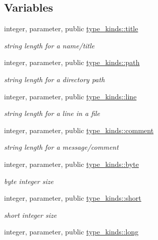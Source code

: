 \subsection*{Variables}
\begin{DoxyCompactItemize}
\item 
integer, parameter, public \hyperlink{namespacetype__kinds_aa2f577aea616d9b9bb91ce438bdf3c02}{type\+\_\+kinds\+::title}
\begin{DoxyCompactList}\small\item\em string length for a name/title \end{DoxyCompactList}\item 
integer, parameter, public \hyperlink{namespacetype__kinds_a05ab6f6ff4279480c4fd6d8b04a3efbf}{type\+\_\+kinds\+::path}
\begin{DoxyCompactList}\small\item\em string length for a directory path \end{DoxyCompactList}\item 
integer, parameter, public \hyperlink{namespacetype__kinds_af0560ef37c612847670ffbfba8a9bc33}{type\+\_\+kinds\+::line}
\begin{DoxyCompactList}\small\item\em string length for a line in a file \end{DoxyCompactList}\item 
integer, parameter, public \hyperlink{namespacetype__kinds_abb1584a815b1c1b79301d6f922366eec}{type\+\_\+kinds\+::comment}
\begin{DoxyCompactList}\small\item\em string length for a message/comment \end{DoxyCompactList}\item 
integer, parameter, public \hyperlink{namespacetype__kinds_a13366a08a0935a72c203e1b880b4d49e}{type\+\_\+kinds\+::byte}
\begin{DoxyCompactList}\small\item\em byte integer size \end{DoxyCompactList}\item 
integer, parameter, public \hyperlink{namespacetype__kinds_ab4d7bfce672e6152e78f87f8aa5b2e04}{type\+\_\+kinds\+::short}
\begin{DoxyCompactList}\small\item\em short integer size \end{DoxyCompactList}\item 
integer, parameter, public \hyperlink{namespacetype__kinds_a14af3c9d56db49c61252b056506a584a}{type\+\_\+kinds\+::long}

\end{DoxyCompactItemize}
